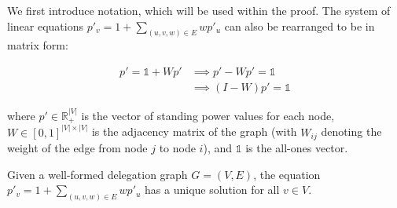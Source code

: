 We first introduce notation, which will be used within the proof. The system of linear equations $p'_v = 1 + \sum_{(u, v, w) \in E} wp'_u$ can also be rearranged to be in matrix form: 

\begin{align*}
p' = \mathbb{1} + Wp' &\implies p' - Wp' = \mathbb{1} \\
&\implies (I - W)p' = \mathbb{1}
\end{align*}

where \( p' \in \mathbb{R}_+^{|V|} \) is the vector of standing power values for each node, \( W \in [0, 1]^{|V| \times |V|} \) is the adjacency matrix of the graph (with \( W_{ij} \) denoting the weight of the edge from node \( j \) to node \( i \)), and \( \mathbb{1} \) is the all-ones vector. 

\begin{theorem}
Given a well-formed delegation graph $G=(V, E)$, the equation $p'_v = 1 + \sum_{(u, v, w) \in E} wp'_u$ has a unique solution for all $v \in V$.
\end{theorem}
